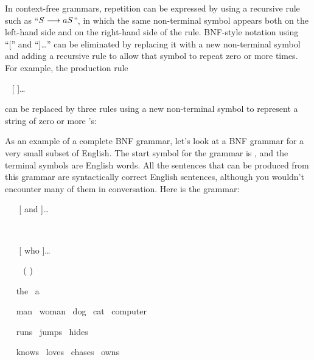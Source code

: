 \smallskip
\noindent In context-free grammars, repetition can be expressed by
using a recursive rule such as ``$S\longrightarrow aS$'', in which the
same non-terminal symbol appears both on the left-hand side and on the right-hand
side of the rule.  BNF-style notation using ``['' and ``]\dots'' can
be eliminated by replacing it with a new non-terminal symbol and adding
a recursive rule to allow that symbol to repeat zero or more times.
For example, the production rule

\smallskip
\centerline{ \BNFPRODUCES\  [  ]\dots}

\smallskip
\noindent can be replaced by three rules using a new non-terminal symbol
 to represent a string of zero or more 's:

\smallskip
\centerline{\vbox{}}

\medbreak

As an example of a complete BNF grammar, let's look at a BNF grammar for a very small
subset of English.  The start symbol for the grammar
is , and the terminal symbols are English words.
All the sentences that can be produced from this grammar
are syntactically correct English sentences, although you wouldn't
encounter many of them in conversation.  Here is the grammar:

\smallskip

\  \BNFPRODUCES\  [ and  ]\dots
\smallskip

\  \BNFPRODUCES\  
\smallskip

\  \BNFPRODUCES\   [ who  ]\dots
\smallskip

\  \BNFPRODUCES\  \BNFALT\ (   )
\smallskip

\  \BNFPRODUCES\ the \BNFALT\ a
\smallskip

\  \BNFPRODUCES\ man \BNFALT\ woman \BNFALT\ dog  \BNFALT\ cat  \BNFALT\ computer
\smallskip

\  \BNFPRODUCES\ runs \BNFALT\ jumps \BNFALT\ hides
\smallskip

\  \BNFPRODUCES\ knows \BNFALT\ loves \BNFALT\ chases  \BNFALT\ owns

